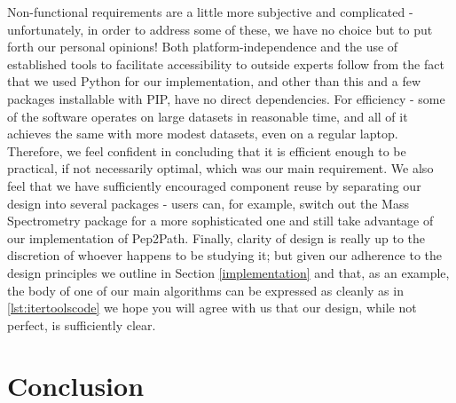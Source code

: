 \documentclass{l4proj}
\begin{document}
Non-functional requirements are a little more subjective and complicated - unfortunately, in order to address some of these, we have no choice but to put forth our personal opinions! Both platform-independence and the use of established tools to facilitate accessibility to outside experts follow from the fact that we used Python for our implementation, and other than this and a few packages installable with PIP, have no direct dependencies. For efficiency - some of the software operates on large datasets in reasonable time, and all of it achieves the same with more modest datasets, even on a regular laptop. Therefore, we feel confident in concluding that it is efficient enough to be practical, if not necessarily optimal, which was our main requirement. We also feel that we have sufficiently encouraged component reuse by separating our design into several packages - users can, for example, switch out the Mass Spectrometry package for a more sophisticated one and still take advantage of our implementation of Pep2Path. Finally, clarity of design is really up to the discretion of whoever happens to be studying it; but given our adherence to the design principles we outline in Section \ref{implementation} and that, as an example, the body of one of our main algorithms can be expressed as cleanly as in \ref{lst:itertoolscode} we hope you will agree with us that our design, while not perfect, is sufficiently clear.

\chapter{Conclusion}    

%
% 
\end{document}
